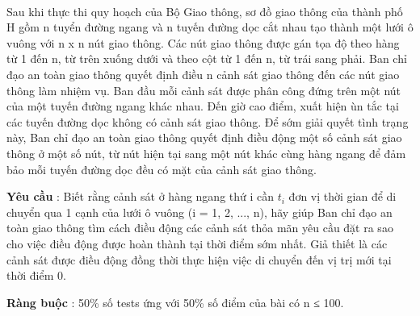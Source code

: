  

Sau khi thực thi quy hoạch của Bộ Giao thông, sơ đồ giao thông của thành phố H gồm n tuyển đường ngang và n tuyến đường dọc cắt nhau tạo thành một lưới ô vuông với n x n nút giao thông. Các nút giao thông được gán tọa độ theo hàng từ 1 đến n, từ trên xuống dưới và theo cột từ 1 đến n, từ trái sang phải. Ban chỉ đạo an toàn giao thông quyết định điều n cảnh sát giao thông đến các nút giao thông làm nhiệm vụ. Ban đầu mỗi cảnh sát được phân công đứng trên một nút của một tuyến đường ngang khác nhau. Đến giờ cao điểm, xuất hiện ùn tắc tại các tuyến đường dọc không có cảnh sát giao thông. Để sớm giải quyết tình trạng này, Ban chỉ đạo an toàn giao thông quyết định điều động một số cảnh sát giao thông ở một số nút, từ nút hiện tại sang một nút khác cùng hàng ngang để đảm bảo mỗi tuyến đường dọc đều có mặt của cảnh sát giao thông.

\textbf{Yêu cầu } : Biết rằng cảnh sát ở hàng ngang thứ i cần $t_{i}$ đơn vị thời gian để di chuyển qua 1 cạnh của lưới ô vuông (i = 1, 2, ..., n), hãy giúp Ban chỉ đạo an toàn giao thông tìm cách điều động các cảnh sát thỏa mãn yêu cầu đặt ra sao cho việc điều động được hoàn thành tại thời điểm sớm nhất. Giả thiết là các cảnh sát được điều động đồng thời thực hiện việc di chuyển đến vị trị mới tại thời điểm 0.

\textbf{Ràng buộc } : 50\% số tests ứng với 50\% số điểm của bài có n ≤ 100.